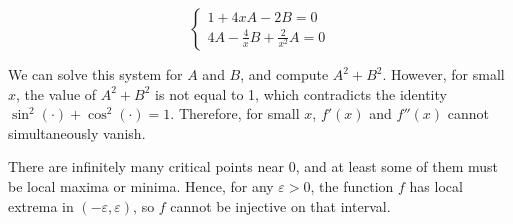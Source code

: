 \documentclass{report}
\begin{document}
\begin{itemize}
\[
\begin{cases}
1 + 4x A - 2 B = 0 \\
4 A - \frac{4}{x} B + \frac{2}{x^2} A = 0
\end{cases}
\]

We can solve this system for \(A\) and \(B\), and compute \(A^2 + B^2\). However, for small \(x\), the value of \(A^2 + B^2\) is not equal to 1, which contradicts the identity \(\sin^2(\cdot) + \cos^2(\cdot) = 1\). Therefore, for small \(x\), \(f'(x)\) and \(f''(x)\) cannot simultaneously vanish.

There are infinitely many critical points near 0, and at least some of them must be local maxima or minima. Hence, for any \(\varepsilon > 0\), the function \(f\) has local extrema in \((-\varepsilon, \varepsilon)\), so \(f\) cannot be injective on that interval.
\end{itemize}
\end{document}
